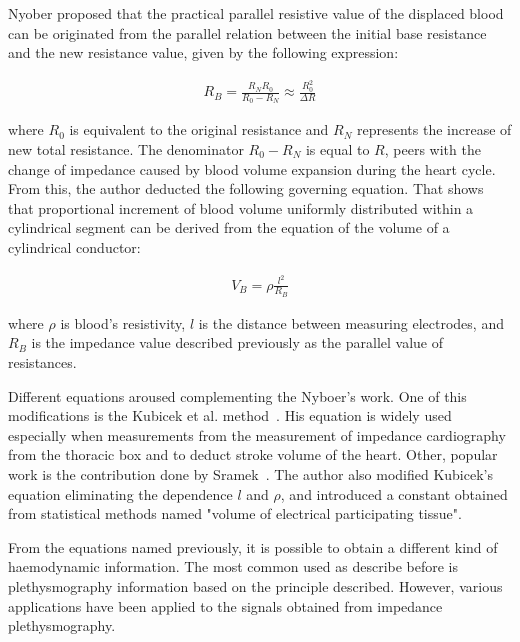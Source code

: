 Nyober proposed that the practical parallel resistive value of the displaced blood can be originated from the parallel relation between the initial base resistance and the new resistance value, given by the following expression:

\begin{align}
R_B=\frac{R_N R_0}{R_0-R_N} \approx \frac{R^2_0}{\Delta R}
\end{align}

where $R_0$ is equivalent to the original resistance and $R_N$ represents the increase of new total resistance. The denominator $R_0 - R_N$ is equal to $R$, peers with the change of impedance caused by blood volume expansion during the heart cycle. From this, the author deducted the following governing equation. That shows that proportional increment of blood volume uniformly distributed within a cylindrical segment can be derived from the equation of the volume of a cylindrical conductor:

\begin{align}
 \label{eq:Nyober}
 V_B = \rho \frac{l^2}{R_B}
\end{align}

where $\rho$ is blood's resistivity, $l$ is the distance between measuring electrodes, and $R_B$ is the impedance value described previously as the parallel value of resistances.

Different equations aroused complementing the Nyboer's work. One of this modifications is the Kubicek et al. method~\cite{karnegis1966development}. His equation is widely used especially when measurements from the measurement of impedance cardiography from the thoracic box and to deduct stroke volume of the heart. Other, popular work is the contribution done by Sramek~\cite{sramek1986bomed}. The author also modified Kubicek's equation eliminating the dependence $l$ and $\rho$,  and introduced a constant obtained from statistical methods named "volume of electrical participating tissue". 


From the equations named previously, it is possible to obtain a different kind of haemodynamic information. The most common used as describe before is plethysmography information based on the principle described. However, various applications have been applied to the signals obtained from impedance plethysmography. 

